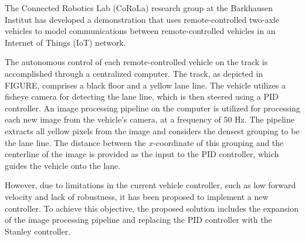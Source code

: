 \documentclass[arbeit=studie,oneside,BCOR=12mm]{ArbeitRST}
\begin{document}
The Connected Robotics Lab (CoRoLa) research group at the Barkhausen Institut
has developed a demonstration that uses remote-controlled two-axle vehicles to
model communications between remote-controlled vehicles in an Internet of
Things (IoT) network.

The autonomous control of each remote-controlled vehicle on the track is
accomplished through a centralized computer. The track, as depicted in FIGURE,
comprises a black floor and a yellow lane line. The vehicle utilizes a fisheye
camera for detecting the lane line, which is then steered using a PID
controller. An image processing pipeline on the computer is utilized for
processing each new image from the vehicle's camera, at a frequency of 50 Hz.
The pipeline extracts all yellow pixels from the image and considers the
densest grouping to be the lane line. The distance between the $x$-coordinate
of this grouping and the centerline of the image is provided as the input to
the PID controller, which guides the vehicle onto the lane.

However, due to limitations in the current vehicle controller, such as low
forward velocity and lack of robustness, it has been proposed to implement a
new controller. To achieve this objective, the proposed solution includes the
expansion of the image processing pipeline and replacing the PID controller
with the Stanley controller. 

\iffalse
At the Connected Robotics Lab (CoRoLa) research group at the Barkhausen
Institut, a demonstration using remote controlled two axle vehicles was
developed. The demonstration is currently in use in order to model
communications between vehicles similar to an Internet of Things (IoT) network.

Due to issues regarding low forward velocity and robustness of the current
vehicle controller, it was proposed to implement a new 

In order to achieve the goals stated above, creation of an image processing
pipeline and implementation of the Stanley controller are proposed.
\fi

\iffalse
Each remote-controlled vehicle is autonomously controlled, using a central
computer, to travel around a track. The track, seen in FIGURE, is composed of a
black floor and a yellow lane line. 

A vehicle is equipped with a fisheye camera to detect the lane line and
steered using a PID controller. The computer has an image processing pipeline,
which processes a new image from the vehicle's camera at a rate of 50 Hz. The
computer extracts all yellow pixels from the image and considers the densest
grouping to be the lane line. The input to the PID controller is then the
distance from the $x$-coordinate of this grouping to the centerline of the
image. These components work together to steer the vehicle onto lane.
\fi
\end{document}
